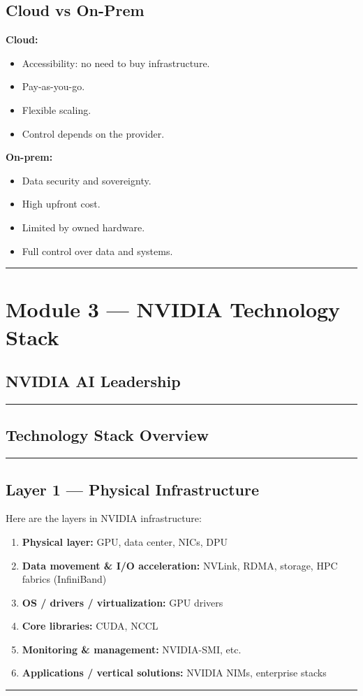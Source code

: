 \documentclass[11pt]{article}
\newcommand{\blue}[1]{\textcolor{myblue}{#1}}
\newcommand{\notespace}{
\vspace{0.8cm}
\hrule
\vspace{0.8cm}
}
\newcommand{\term}[1]{\blue{\textbf{#1}}}
\begin{document}
\subsection{Cloud vs On-Prem}
\textbf{Cloud:}
\begin{itemize}
\item Accessibility: no need to buy infrastructure.
\item Pay-as-you-go.
\item Flexible scaling.
\item Control depends on the provider.
\end{itemize}

\textbf{On-prem:}
\begin{itemize}
\item Data security and sovereignty.
\item High upfront cost.
\item Limited by owned hardware.
\item Full control over data and systems.
\end{itemize}
\notespace

\section{Module 3 — NVIDIA Technology Stack}

\subsection{NVIDIA AI Leadership}
\notespace

\subsection{Technology Stack Overview}
\notespace

\subsection{Layer 1 — Physical Infrastructure}
Here are the layers in NVIDIA infrastructure:
\begin{enumerate}
\item \term{Physical layer:} GPU, data center, NICs, DPU
\item \term{Data movement \& I/O acceleration:} NVLink, RDMA, storage, HPC fabrics (InfiniBand)
\item \term{OS / drivers / virtualization:} GPU drivers
\item \term{Core libraries:} CUDA, NCCL
\item \term{Monitoring \& management:} NVIDIA-SMI, etc.
\item \term{Applications / vertical solutions:} NVIDIA NIMs, enterprise stacks
\end{enumerate}
\notespace
\end{document}
